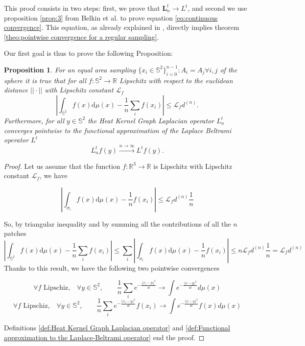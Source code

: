 \documentclass{article} %
\newtheorem{prop}{Proposition}
\renewcommand{\b}[1]{{\bm{#1}}}   %
\begin{document}
This proof consists in two steps: first, we prove that $\b L_n^t \rightarrow L^t$, and second we use proposition \ref{prop:3} from Belkin et al. to prove equation \ref{eq:continuous convergence}. This equation, as already explained in \cite{belkin2007convergence}, directly implies theorem \ref{theo:pointwise convergence for a regular sampling}.

Our first goal is thus to prove the following Proposition:
\vspace{0.5cm}
\begin{prop}\label{prop:1}
	For an equal area sampling $\{x_i\in\mathbb S^2\}_{i=0}^{n-1}: A_i=A_j \forall i,j$ of the sphere it is true that for all $f: \mathbb S^2 \rightarrow \mathbb R$ Lipschitz with respect to the euclidean distance $||\cdot||$ with Lipschitz constant $\mathcal L_f$
	$$
	\left| \int_{\mathbb S^2}f({ x})\text{d}{\mu(x)} - \frac{1}{n}\sum_i f( x_i)\right|\leq \mathcal L_fd^{(n)}.
	$$
	Furthermore, for all $y\in\mathbb S^2$ the Heat Kernel Graph Laplacian operator $L^t_n$ converges pointwise to the functional approximation of the Laplace Beltrami operator $L^t$
	$$ L_n^tf(y)\xrightarrow{n\to\infty} L^tf(y).$$
\end{prop}
\vspace{0.5cm}

\begin{proof}

	Let us assume that the function $f:\mathbb R^3\rightarrow \mathbb R$ is Lipschitz with Lipschitz constant $\mathcal L_f$, we have

	$$\left| \int_{\sigma_{i}}f({ x})\text{d}{\mu(x)} - \frac{1}{n}f( x_i)\right| \leq \mathcal L_fd^{(n)}\frac{1}{n} $$

	So, by triangular inequality and by summing all the contributions of all the $n$ patches
	$$\left| \int_{\mathbb S^2}f({ x})\text{d}{\mu(x)} - \frac{1}{n}\sum_i f( x_i)\right| \leq \sum_i \left| \int_{\sigma_{i}}f({ x})\text{d}{\mu(x)} - \frac{1}{n}f( x_i)\right|\leq n  \mathcal L_fd^{(n)}\frac{1}{n} = \mathcal L_fd^{(n)}$$
	Thanks to this result, we have the following two pointwise convergences

	$$\forall f \text{ Lipschiz,}\quad \forall y\in\mathbb S^2,  \quad\quad \frac{1}{n}\sum_i e^{-\frac{||x_i-y||^2}{4t}}\rightarrow \int e^{-\frac{||x-y||^2}{4t}}d\mu(x)$$
	$$\forall f \text{ Lipschiz,}\quad \forall y\in\mathbb S^2,  \quad\quad \frac{1}{n}\sum_i e^{-\frac{||x_i-y||^2}{4t}}f(x_i)\rightarrow \int e^{-\frac{||x-y||^2}{4t}}f(x)d\mu(x)$$

	Definitions \ref{def:Heat Kernel Graph Laplacian operator} and \ref{def:Functional approximation to the Laplace-Beltrami operator} end the proof.
\end{proof}
\vspace{0.5cm}
\end{document}
